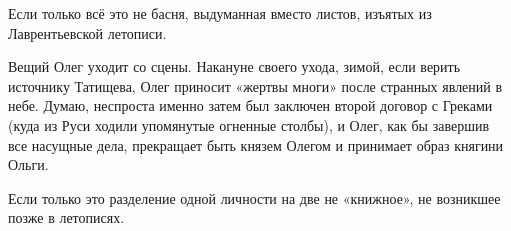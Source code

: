 Если только всё это не басня, выдуманная вместо листов, изъятых из Лаврентьевской летописи.



Вещий Олег уходит со сцены. Накануне своего ухода, зимой, если верить источнику Татищева, Олег приносит «жертвы многи» после странных явлений в небе. Думаю, неспроста именно затем был заключен второй договор с Греками (куда из Руси ходили упомянутые огненные столбы), и Олег, как бы завершив все насущные дела, прекращает быть князем Олегом и принимает образ княгини Ольги.

Если только это разделение одной личности на две не «книжное», не возникшее позже в летописях.